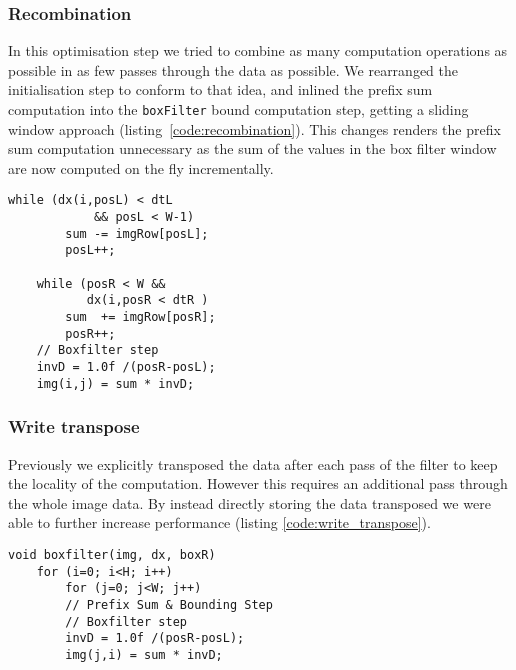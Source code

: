 \subsubsection{Recombination}

In this optimisation step we tried to combine as many computation operations as possible in as few passes through the data as possible. We rearranged the initialisation step to conform to that idea, and inlined the prefix sum computation into the \lstinline{boxFilter} bound computation step, getting a sliding window approach (listing~\ref{code:recombination}). This changes renders the prefix sum computation unnecessary as the sum of the values in the box filter window are now computed on the fly incrementally.

\begin{lstlisting}[caption=Recombination, label=code:recombination]
    while (dx(i,posL) < dtL 
            && posL < W-1)
        sum -= imgRow[posL];
        posL++;

    while (posR < W && 
           dx(i,posR < dtR )
        sum  += imgRow[posR];
        posR++;
    // Boxfilter step
    invD = 1.0f /(posR-posL);
    img(i,j) = sum * invD;
\end{lstlisting}

\subsubsection{Write transpose}\label{sec:method:write_transposed}

Previously we explicitly transposed the data after each pass of the filter to keep the locality of the computation. However this requires an additional pass through the whole image data. By instead directly storing the data transposed we were able to further increase performance (listing \ref{code:write_transpose}). 
\begin{lstlisting}[caption=Write transpose, label=code:write_transpose]
void boxfilter(img, dx, boxR) 
    for (i=0; i<H; i++)
        for (j=0; j<W; j++)
        // Prefix Sum & Bounding Step
        // Boxfilter step
        invD = 1.0f /(posR-posL);
        img(j,i) = sum * invD;
\end{lstlisting}

